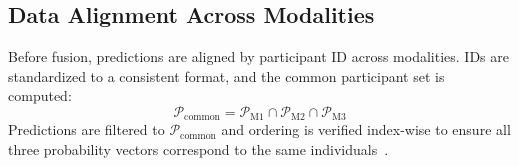\documentclass[10pt,letterpaper]{article}
\begin{document}
                                                                                                          \subsection*{Data Alignment Across Modalities}
                                                                                                                          Before fusion, predictions are aligned by participant ID across modalities. IDs are standardized to a consistent format, and the common participant set is computed:
                                                                                                                          \begin{equation}
                                                                                                                          \mathcal{P}_{\text{common}}=\mathcal{P}_{\text{M1}}\cap \mathcal{P}_{\text{M2}}\cap \mathcal{P}_{\text{M3}}
                                                                                                                          \end{equation}
                                                                                                                          Predictions are filtered to $\mathcal{P}_{\text{common}}$ and ordering is verified index-wise to ensure all three probability vectors correspond to the same individuals~\cite{ref57}.
\end{document}

